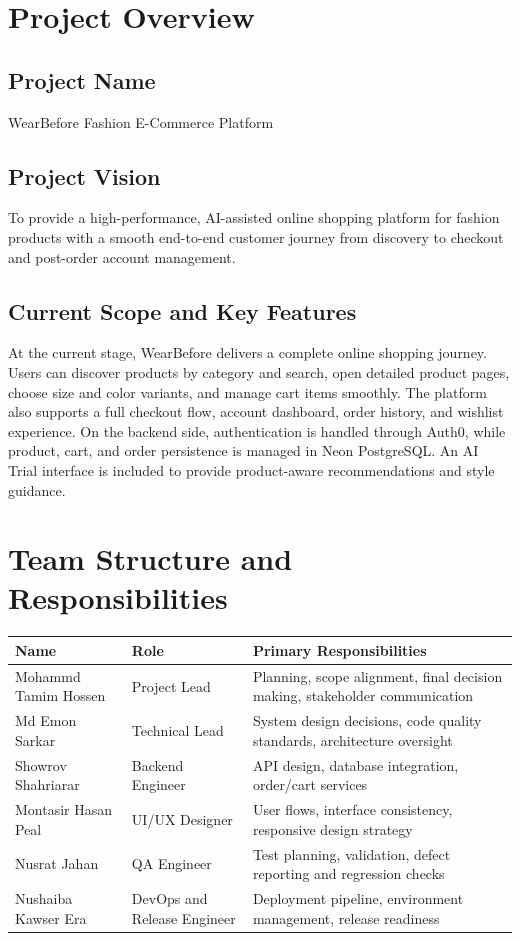 \documentclass[12pt,a4paper]{article}
\begin{document}
\section{Project Overview}
\subsection{Project Name}
WearBefore Fashion E-Commerce Platform

\subsection{Project Vision}
To provide a high-performance, AI-assisted online shopping platform for fashion products with a smooth end-to-end customer journey from discovery to checkout and post-order account management.

\subsection{Current Scope and Key Features}
At the current stage, WearBefore delivers a complete online shopping journey. Users can discover products by category and search, open detailed product pages, choose size and color variants, and manage cart items smoothly. The platform also supports a full checkout flow, account dashboard, order history, and wishlist experience. On the backend side, authentication is handled through Auth0, while product, cart, and order persistence is managed in Neon PostgreSQL. An AI Trial interface is included to provide product-aware recommendations and style guidance.

\section{Team Structure and Responsibilities}
\begin{longtable}{p{} p{} p{}}
\toprule
\textbf{Name} & \textbf{Role} & \textbf{Primary Responsibilities} \\
\midrule
Mohammd Tamim Hossen & Project Lead & Planning, scope alignment, final decision making, stakeholder communication \\
Md Emon Sarkar & Technical Lead & System design decisions, code quality standards, architecture oversight \\
Showrov Shahriarar & Backend Engineer & API design, database integration, order/cart services \\
Montasir Hasan Peal & UI/UX Designer & User flows, interface consistency, responsive design strategy \\
Nusrat Jahan & QA Engineer & Test planning, validation, defect reporting and regression checks \\
Nushaiba Kawser Era & DevOps and Release Engineer & Deployment pipeline, environment management, release readiness \\
\bottomrule
\end{longtable}
\end{document}
